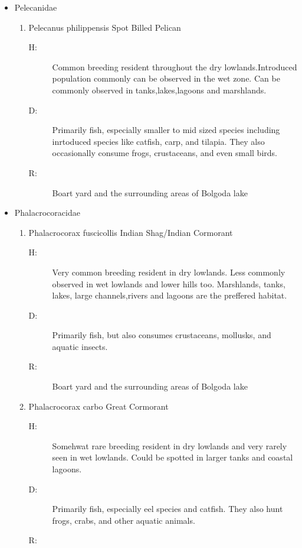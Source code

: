 \begin{itemize}
\begin{enumerate}
\begin{description}
\end{description}%
\end{enumerate}%
\item%
Pelecanidae%
\begin{enumerate}%
\item%
Pelecanus philippensis\newline%
Spot Billed Pelican%
\begin{description}%
\item[H: ]%
Common breeding resident throughout the dry lowlands.Introduced population commonly can be observed in the wet zone.  Can be commonly observed in tanks,lakes,lagoons and marshlands.%
\item[D: ]%
Primarily fish, especially smaller to mid sized species including inrtoduced species like catfish, carp, and tilapia. They also occasionally consume frogs, crustaceans, and even small birds.%
\item[R: ]%
Boart yard and the surrounding areas of Bolgoda lake%
\end{description}%
\end{enumerate}%
\item%
Phalacrocoracidae%
\begin{enumerate}%
\item%
Phalacrocorax fuscicollis\newline%
Indian Shag/Indian Cormorant%
\begin{description}%
\item[H: ]%
Very common breeding resident in dry lowlands. Less commonly observed in wet lowlands and lower hills too. Marshlands, tanks, lakes, large channels,rivers and lagoons are the preffered habitat.%
\item[D: ]%
Primarily fish, but also consumes crustaceans, mollusks, and aquatic insects.%
\item[R: ]%
Boart yard and the surrounding areas of Bolgoda lake%
\end{description}%
\item%
Phalacrocorax carbo\newline%
Great Cormorant%
\begin{description}%
\item[H: ]%
Somehwat rare breeding resident in dry lowlands and very rarely seen in wet lowlands. Could be spotted in larger tanks and coastal lagoons.%
\item[D: ]%
Primarily fish, especially eel species and catfish. They also hunt frogs, crabs, and other aquatic animals.%
\item[R: ]%

\end{description}
\end{enumerate}
\end{itemize}
